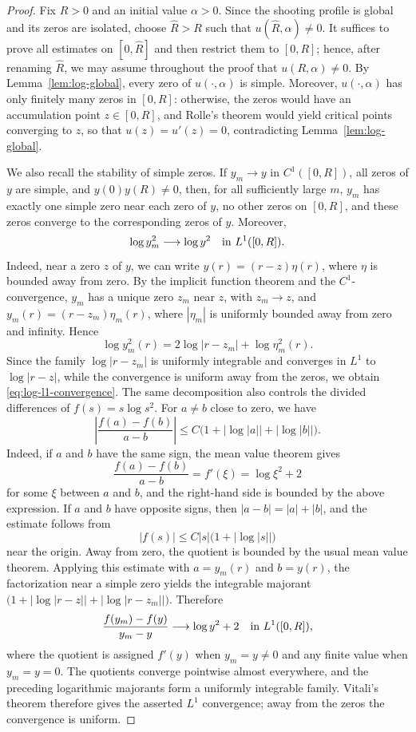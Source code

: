 \documentclass[11pt]{article}
\begin{document}
\begin{proof}
Fix $R>0$ and an initial value $\alpha>0$.  Since the shooting profile
is global and its zeros are isolated, choose $\widehat R>R$ such that
$u(\widehat R,\alpha)\ne0$.  It suffices to prove all estimates on
$[0,\widehat R]$ and then restrict them to $[0,R]$; hence, after
renaming $\widehat R$, we may assume throughout the proof that
{$u(R,\alpha)\ne0$.} By Lemma~\ref{lem:log-global}, every zero of $u(\cdot,\alpha)$ is simple. Moreover, $u(\cdot,\alpha)$  has only finitely many zeros in $[0,R]$: otherwise, the zeros would have an accumulation point $z\in[0,R]$, and Rolle's theorem would yield critical points converging to $z$, so that $u(z)=u'(z)=0$, contradicting Lemma~\ref{lem:log-global}.

We also recall the stability of simple zeros. {If
$y_m\to y$ in $C^1([0,R])$, all zeros of $y$ are simple, and
$y(0)y(R)\ne0$, then, for all sufficiently large $m$, $y_m$ has
exactly one simple zero near each zero of $y$, no other zeros on
$[0,R]$, and these zeros converge to the corresponding zeros of $y$.}
Moreover,
\begin{equation}\label{eq:log-l1-convergence}
 \log y_m^2\longrightarrow \log y^2\quad\hbox{in }L^1([0,R]).
\end{equation}
Indeed, near a zero $z$ of $y$, we can write $y(r)=(r-z)\eta(r)$, where $\eta$ is bounded away from zero. By the implicit function theorem and the $C^1$-convergence, $y_m$ has a unique zero $z_m$ near $z$, with $z_m\to z$, and $y_m(r)=(r-z_m)\eta_m(r)$, where $|\eta_m|$ is uniformly bounded away from zero and infinity. Hence
\[
 \log y_m^2(r)=2\log|r-z_m|+\log\eta_m^2(r).
\]
Since the family $\log|r-z_m|$ is uniformly integrable and converges in $L^1$ to
$\log|r-z|$, while the convergence is uniform away from the zeros, we obtain \eqref{eq:log-l1-convergence}.
The same decomposition also controls the divided differences of $f(s)=s\log s^2$. For $a\ne b$ close to zero, we have
\[
 \left|\frac{f(a)-f(b)}{a-b}\right|
 \leq C\bigl(1+|\log |a||+|\log |b||\bigr).
\]
Indeed, if $a$ and $b$ have the same sign, the mean value theorem gives
\[
\frac{f(a)-f(b)}{a-b}=f'(\xi)
=\log \xi^2+2
\]
for some $\xi$ between $a$ and $b$, and the right-hand side is bounded by the
above expression. If $a$ and $b$ have opposite signs, then
$|a-b|=|a|+|b|$, and the estimate follows from
\[
|f(s)|\leq C|s|\bigl(1+|\log|s||\bigr)
\]
near the origin. Away from zero, the quotient is bounded by the usual mean value theorem.
Applying this estimate with $a=y_m(r)$ and $b=y(r)$, the factorization near a
simple zero yields the integrable majorant  $\bigl(1+|\log|r-z||+|\log|r-z_m||\bigr)$.
Therefore
\begin{equation}\label{eq:log-dd-l1-convergence}
 {\frac{f(y_m)-f(y)}{y_m-y}}
 \longrightarrow \log y^2+2\quad\hbox{in }L^1([0,R]),
\end{equation}
{where the quotient is assigned $f'(y)$ when $y_m=y\ne0$
and any finite value when $y_m=y=0$.}
{The quotients converge pointwise almost everywhere, and
the preceding logarithmic majorants form a uniformly integrable
family. Vitali's theorem therefore gives the asserted $L^1$
convergence; away from the zeros the convergence is uniform.}



\end{proof}
\end{document}
